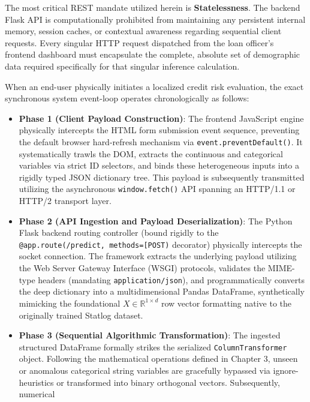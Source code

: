 The most critical REST mandate utilized herein is
\textbf{Statelessness}. The backend Flask API is computationally
prohibited from maintaining any persistent internal memory, session
caches, or contextual awareness regarding sequential client requests.
Every singular HTTP request dispatched from the loan officer's frontend
dashboard must encapsulate the complete, absolute set of demographic
data required specifically for that singular inference calculation.

When an end-user physically initiates a localized credit risk
evaluation, the exact synchronous system event-loop operates
chronologically as follows:

\begin{itemize}
\tightlist
\item
  \textbf{Phase 1 (Client Payload Construction)}: The frontend
  JavaScript engine physically intercepts the HTML form submission event
  sequence, preventing the default browser hard-refresh mechanism via
  \texttt{event.preventDefault()}. It systematically trawls the DOM,
  extracts the continuous and categorical variables via strict ID
  selectors, and binds these heterogeneous inputs into a rigidly typed
  JSON dictionary tree. This payload is subsequently transmitted
  utilizing the asynchronous \texttt{window.fetch()} API spanning an
  HTTP/1.1 or HTTP/2 transport layer.
\item
  \textbf{Phase 2 (API Ingestion and Payload Deserialization)}: The
  Python Flask backend routing controller (bound rigidly to the
  \texttt{@app.route(\textquotesingle{}/predict\textquotesingle{},\ methods={[}\textquotesingle{}POST\textquotesingle{}{]})}
  decorator) physically intercepts the socket connection. The framework
  extracts the underlying payload utilizing the Web Server Gateway
  Interface (WSGI) protocols, validates the MIME-type headers (mandating
  \texttt{application/json}), and programmatically converts the deep
  dictionary into a multidimensional Pandas DataFrame, synthetically
  mimicking the foundational \(X \in \mathbb{R}^{1 \times d}\) row
  vector formatting native to the originally trained Statlog dataset.
\item
  \textbf{Phase 3 (Sequential Algorithmic Transformation)}: The ingested
  structured DataFrame formally strikes the serialized
  \texttt{ColumnTransformer} object. Following the mathematical
  operations defined in Chapter 3, unseen or anomalous categorical
  string variables are gracefully bypassed via ignore-heuristics or
  transformed into binary orthogonal vectors. Subsequently, numerical

\end{itemize}
